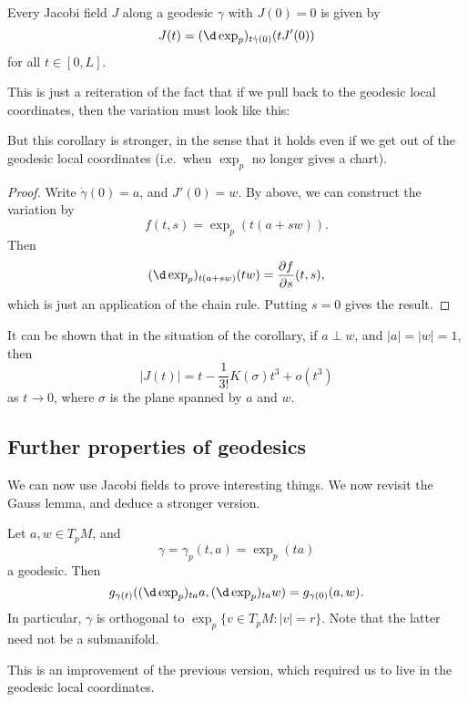 \documentclass[a4paper]{article}
\begin{document}
\begin{cor}
  Every Jacobi field $J$ along a geodesic $\gamma$ with $J(0) = 0$ is given by
  \[
    J(t) = (\d \exp_p)_{t \dot{\gamma}(0)} (t J'(0))
  \]
  for all $t \in [0, L]$.
\end{cor}
This is just a reiteration of the fact that if we pull back to the geodesic local coordinates, then the variation must look like this:
\begin{center}
\end{center}
But this corollary is stronger, in the sense that it holds even if we get out of the geodesic local coordinates (i.e.\ when $\exp_p$ no longer gives a chart).

\begin{proof}
  Write $\dot{\gamma}(0) = a$, and $J'(0) = w$. By above, we can construct the variation by
  \[
    f(t, s) = \exp_p(t (a + sw)).
  \]
  Then
  \[
    (\d \exp_p)_{t(a + sw)} (tw) = \frac{\partial f}{\partial s}(t, s),
  \]
  which is just an application of the chain rule. Putting $s = 0$ gives the result.
\end{proof}

It can be shown that in the situation of the corollary, if $a \perp w$, and $|a| = |w| = 1$, then
\[
  |J(t)| = t - \frac{1}{3!} K(\sigma) t^3 + o(t^3)
\]
as $t \to 0$, where $\sigma$ is the plane spanned by $a$ and $w$.

\subsection{Further properties of geodesics}
We can now use Jacobi fields to prove interesting things. We now revisit the Gauss lemma, and deduce a stronger version.
\begin{lemma}
  Let $a, w \in T_p M$, and
  \[
    \gamma = \gamma_p(t, a) = \exp_p(ta)
  \]
  a geodesic. Then
  \[
    g_{\gamma(t)} ((\d \exp_p)_{ta} a, (\d \exp_p)_{ta} w) = g_{\gamma(0)}(a, w).
  \]
  In particular, $\gamma$ is orthogonal to $\exp_p \{v \in T_p M: |v| = r\}$. Note that the latter need not be a submanifold.
\end{lemma}
This is an improvement of the previous version, which required us to live in the geodesic local coordinates.
\end{document}
